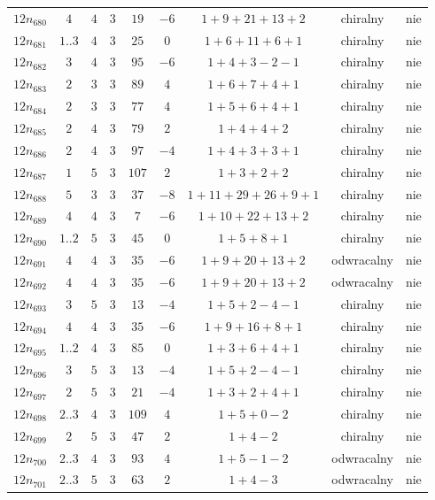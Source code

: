 \begin{longtable}{ccccccccc}
$12n_{680}$ & $4$ & $4$ & $3$ & $19$ & $-6$ & $1+9+21+13+2$ & chiralny & nie \\
$12n_{681}$ & $1..3$ & $4$ & $3$ & $25$ & $0$ & $1+6+11+6+1$ & chiralny & nie \\
$12n_{682}$ & $3$ & $4$ & $3$ & $95$ & $-6$ & $1+4+3-2-1$ & chiralny & nie \\
$12n_{683}$ & $2$ & $3$ & $3$ & $89$ & $4$ & $1+6+7+4+1$ & chiralny & nie \\
$12n_{684}$ & $2$ & $3$ & $3$ & $77$ & $4$ & $1+5+6+4+1$ & chiralny & nie \\
$12n_{685}$ & $2$ & $4$ & $3$ & $79$ & $2$ & $1+4+4+2$ & chiralny & nie \\
$12n_{686}$ & $2$ & $4$ & $3$ & $97$ & $-4$ & $1+4+3+3+1$ & chiralny & nie \\
$12n_{687}$ & $1$ & $5$ & $3$ & $107$ & $2$ & $1+3+2+2$ & chiralny & nie \\
$12n_{688}$ & $5$ & $3$ & $3$ & $37$ & $-8$ & $1+11+29+26+9+1$ & chiralny & nie \\
$12n_{689}$ & $4$ & $4$ & $3$ & $7$ & $-6$ & $1+10+22+13+2$ & chiralny & nie \\
$12n_{690}$ & $1..2$ & $5$ & $3$ & $45$ & $0$ & $1+5+8+1$ & chiralny & nie \\
$12n_{691}$ & $4$ & $4$ & $3$ & $35$ & $-6$ & $1+9+20+13+2$ & odwracalny & nie \\
$12n_{692}$ & $4$ & $4$ & $3$ & $35$ & $-6$ & $1+9+20+13+2$ & odwracalny & nie \\
$12n_{693}$ & $3$ & $5$ & $3$ & $13$ & $-4$ & $1+5+2-4-1$ & chiralny & nie \\
$12n_{694}$ & $4$ & $4$ & $3$ & $35$ & $-6$ & $1+9+16+8+1$ & chiralny & nie \\
$12n_{695}$ & $1..2$ & $4$ & $3$ & $85$ & $0$ & $1+3+6+4+1$ & chiralny & nie \\
$12n_{696}$ & $3$ & $5$ & $3$ & $13$ & $-4$ & $1+5+2-4-1$ & chiralny & nie \\
$12n_{697}$ & $2$ & $5$ & $3$ & $21$ & $-4$ & $1+3+2+4+1$ & chiralny & nie \\
$12n_{698}$ & $2..3$ & $4$ & $3$ & $109$ & $4$ & $1+5+0-2$ & chiralny & nie \\
$12n_{699}$ & $2$ & $5$ & $3$ & $47$ & $2$ & $1+4-2$ & chiralny & nie \\
$12n_{700}$ & $2..3$ & $4$ & $3$ & $93$ & $4$ & $1+5-1-2$ & odwracalny & nie \\
$12n_{701}$ & $2..3$ & $5$ & $3$ & $63$ & $2$ & $1+4-3$ & odwracalny & nie \\

\end{longtable}
